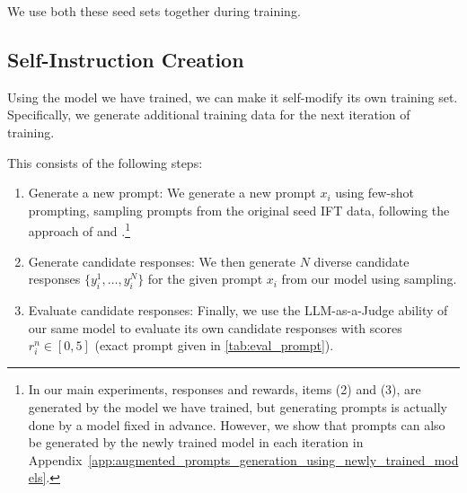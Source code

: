 \documentclass{article}
\begin{document}
We use  both these seed sets together during training. 


\subsection{Self-Instruction Creation} \label{sec:creation}

Using the model we have trained, we can make it self-modify its own training set.
Specifically, we generate additional training data for the next iteration of training.


This consists of the following steps:


 \begin{enumerate}[topsep=0pt,itemsep=4pt,parsep=0pt] %

\item { Generate a new prompt}: We generate a new prompt $x_i$ using few-shot prompting, sampling prompts from the original seed IFT data, following the approach of \citet{wang2022self} and \citet{honovich2022unnatural}.\footnote{In our main experiments, responses and rewards, items (2) and (3), are generated by the model we have trained, but generating prompts is actually done by a model fixed in advance. However, we show that prompts can also be generated by the newly trained model in each iteration in Appendix~\ref{app:augmented_prompts_generation_using_newly_trained_models}.} %


\item {Generate candidate responses}: We then generate $N$ diverse candidate responses $\{y_i^1, \ldots, y_i^N\}$ for the given prompt $x_i$ from our model using sampling. %

\item {Evaluate candidate responses}: Finally, we use the {LLM-as-a-Judge} ability of our same model to evaluate its own candidate responses with scores $r_i^n \in [0,5]$ (exact prompt given in \autoref{tab:eval_prompt}). 

 \end{enumerate}
 
\end{document}
